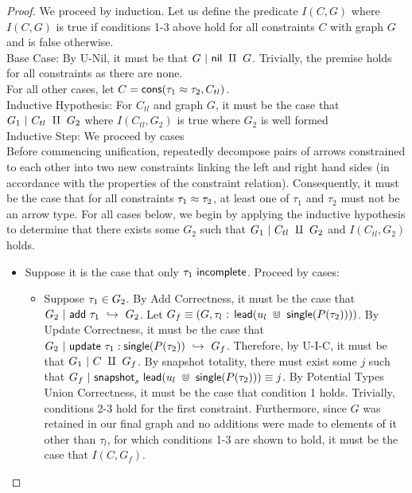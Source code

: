 \begin{proof}
We proceed by induction. Let us define the predicate $I(C, G)$ where $I(C, G)$ is true if conditions 1-3 above hold for all constraints $C$ with graph $G$ and is false otherwise.\\
Base Case:
By U-Nil, it must be that $G~|~\normalfont\textsf{nil}~\amalg~G$. Trivially, the premise holds for all constraints as there are none.\\
For all other cases, let $C = \normalfont\textsf{cons}({\tau_1} \approx {\tau_2}, C_{tl})$.\\
Inductive Hypothesis: 
For $C_{tl}$ and graph $G$, it must be the case that $G_1~|~C_{tl}~\amalg~G_2$ where $I(C_{tl}, G_2)$ is true where $G_2$ is well formed\\
Inductive Step:
We proceed by cases\\
Before commencing unification, repeatedly decompose pairs of arrows constrained to each other into two new constraints linking the left and right hand sides (in accordance with the properties of the constraint relation). Consequently, it must be the case that for all constraints ${\tau_1} \approx {\tau_2}$, at least one of $\tau_1$ and $\tau_2$ must not be an arrow type.
For all cases below, we begin by applying the inductive hypothesis to determine that there exists some $G_2$ such that $G_1~|~C_{tl}~\amalg~G_2$ and $I(C_{tl}, G_2)$ holds. 
\begin{itemize}
    \item Suppose it is the case that only $\tau_1 ~ \normalfont\textsf{incomplete}$.
    Proceed by cases:
    \begin{itemize}
        \item Suppose $\tau_1 \in G_2$. By Add Correctness, it must be the case that $G_2~|~\normalfont\textsf{add}~\tau_1 ~\hookrightarrow~ G_2$. Let $G_f \equiv (G, \tau_l\normalfont\textsf{ : }\normalfont\textsf{lead}(u_l~\Cup~\normalfont\textsf{single}(P(\tau_2))))$. By Update Correctness, it must be the case that $G_2~|~\normalfont\textsf{update}~\tau_1:\normalfont\textsf{single}(P(\tau_2)) ~\hookrightarrow~ G_f$. Therefore, by U-I-C, it must be that $G_1~|~C~\amalg~G_f$. By snapshot totality, there must exist some $j$ such that $G_f~|~\normalfont\textsf{snapshot}_s~\normalfont\textsf{lead}(u_l~\Cup~\normalfont\textsf{single}(P(\tau_2))) \equiv j$. By Potential Types Union Correctness, it must be the case that condition 1 holds. Trivially, conditions 2-3 hold for the first constraint. Furthermore, since $G$ was retained in our final graph and no additions were made to elements of it other than $\tau_l$, for which conditions 1-3 are shown to hold, it must be the case that $I(C, G_f)$.
        

\end{itemize}
\end{itemize}
\end{proof}
